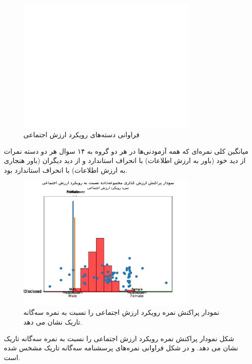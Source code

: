 \begin{figure}[htpb]
    \centering
    \includegraphics[width=0.8\textwidth]{./img/SVOAgainstPopulation.pdf}
    \caption{فراوانی دسته‌های رویکرد ارزش اجتماعی}
    \label{fig:SVOAgainstPopulation}
\end{figure}
میانگین کلی نمره‌ای که همه آزمودنی‌ها در هر دو گروه به ۱۴ سوال هر دو دسته
نمرات از دید خود
\!(باور به ارزش اطلاعات)
\meanOfSelfWTPAllTwoParticipantGroupsAllTwoQuestionSection
با انحراف استاندارد
\SDOfSelfWTPAllTwoParticipantGroupsAllTwoQuestionSection
و از دید دیگران
\meanOfOtherWTPAllTwoParticipantGroupsAllTwoQuestionSection
\!(باور هنجاری به ارزش اطلاعات)
با انحراف استاندارد
\SDOfOtherWTPAllTwoParticipantGroupsAllTwoQuestionSection
بود.

\begin{figure}[htpb]
    \centering
    \includegraphics[width=0.8\textwidth]{./img/ScatterSVOScoreDarkTriadScore.pdf}
    \caption{نمودار پراکنش نمره رویکرد ارزش اجتماعی را نسبت به نمره سه‌گانه تاریک نشان می دهد. }
    \label{fig:ScatterSVOScoreDarkTriadScore}
\end{figure}
شکل
\label{fig:sexualityAndSVOAgainstPopulation}
نمودار پراکنش نمره رویکرد ارزش اجتماعی را نسبت به نمره سه‌گانه تاریک نشان می دهد.
و در شکل
\label{fig:SexToDTR}
فراوانی نمره‌های پرسشنامه سه‌گانه تاریک مشخس شده است.




